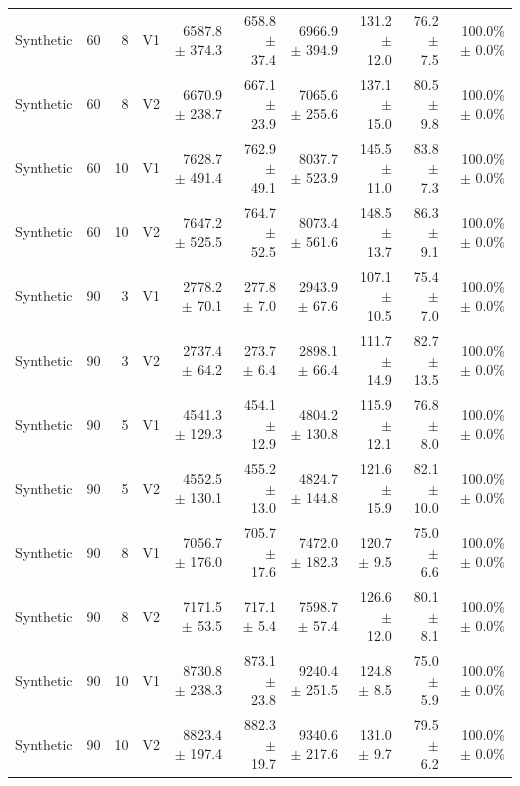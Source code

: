 \documentclass[10pt,a4paper]{article}
\begin{document}
\begin{landscape}
\begin{longtable}{@{}lrrlrrrrrr@{}}
Synthetic & 60 & 8 & V1 & 6587.8 $\pm$ 374.3 & 658.8 $\pm$ 37.4 & 6966.9 $\pm$ 394.9 & 131.2 $\pm$ 12.0 & 76.2 $\pm$ 7.5 & 100.0\% $\pm$ 0.0\% \\
Synthetic & 60 & 8 & V2 & 6670.9 $\pm$ 238.7 & 667.1 $\pm$ 23.9 & 7065.6 $\pm$ 255.6 & 137.1 $\pm$ 15.0 & 80.5 $\pm$ 9.8 & 100.0\% $\pm$ 0.0\% \\
Synthetic & 60 & 10 & V1 & 7628.7 $\pm$ 491.4 & 762.9 $\pm$ 49.1 & 8037.7 $\pm$ 523.9 & 145.5 $\pm$ 11.0 & 83.8 $\pm$ 7.3 & 100.0\% $\pm$ 0.0\% \\
Synthetic & 60 & 10 & V2 & 7647.2 $\pm$ 525.5 & 764.7 $\pm$ 52.5 & 8073.4 $\pm$ 561.6 & 148.5 $\pm$ 13.7 & 86.3 $\pm$ 9.1 & 100.0\% $\pm$ 0.0\% \\
Synthetic & 90 & 3 & V1 & 2778.2 $\pm$ 70.1 & 277.8 $\pm$ 7.0 & 2943.9 $\pm$ 67.6 & 107.1 $\pm$ 10.5 & 75.4 $\pm$ 7.0 & 100.0\% $\pm$ 0.0\% \\
Synthetic & 90 & 3 & V2 & 2737.4 $\pm$ 64.2 & 273.7 $\pm$ 6.4 & 2898.1 $\pm$ 66.4 & 111.7 $\pm$ 14.9 & 82.7 $\pm$ 13.5 & 100.0\% $\pm$ 0.0\% \\
Synthetic & 90 & 5 & V1 & 4541.3 $\pm$ 129.3 & 454.1 $\pm$ 12.9 & 4804.2 $\pm$ 130.8 & 115.9 $\pm$ 12.1 & 76.8 $\pm$ 8.0 & 100.0\% $\pm$ 0.0\% \\
Synthetic & 90 & 5 & V2 & 4552.5 $\pm$ 130.1 & 455.2 $\pm$ 13.0 & 4824.7 $\pm$ 144.8 & 121.6 $\pm$ 15.9 & 82.1 $\pm$ 10.0 & 100.0\% $\pm$ 0.0\% \\
Synthetic & 90 & 8 & V1 & 7056.7 $\pm$ 176.0 & 705.7 $\pm$ 17.6 & 7472.0 $\pm$ 182.3 & 120.7 $\pm$ 9.5 & 75.0 $\pm$ 6.6 & 100.0\% $\pm$ 0.0\% \\
Synthetic & 90 & 8 & V2 & 7171.5 $\pm$ 53.5 & 717.1 $\pm$ 5.4 & 7598.7 $\pm$ 57.4 & 126.6 $\pm$ 12.0 & 80.1 $\pm$ 8.1 & 100.0\% $\pm$ 0.0\% \\
Synthetic & 90 & 10 & V1 & 8730.8 $\pm$ 238.3 & 873.1 $\pm$ 23.8 & 9240.4 $\pm$ 251.5 & 124.8 $\pm$ 8.5 & 75.0 $\pm$ 5.9 & 100.0\% $\pm$ 0.0\% \\
Synthetic & 90 & 10 & V2 & 8823.4 $\pm$ 197.4 & 882.3 $\pm$ 19.7 & 9340.6 $\pm$ 217.6 & 131.0 $\pm$ 9.7 & 79.5 $\pm$ 6.2 & 100.0\% $\pm$ 0.0\% \\
\bottomrule\end{longtable}\end{landscape}
\end{document}
